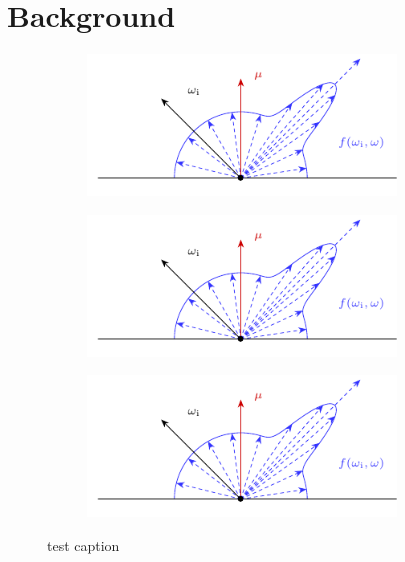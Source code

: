 \documentclass[crop=false]{standalone}
\begin{document}
  \section{Background}

  \begin{figure}[H]
    \center
    \begin{subfigure}[b]{0.32\textwidth}
      \center
      \includegraphics[width=0.9\textwidth]{brdf_1.pdf}
    \end{subfigure}
    \begin{subfigure}[b]{0.32\textwidth}
      \center
      \includegraphics[width=0.9\textwidth]{brdf_1.pdf}
    \end{subfigure}
    \begin{subfigure}[b]{0.32\textwidth}
      \center
      \includegraphics[width=0.9\textwidth]{brdf_1.pdf}
    \end{subfigure}
    \caption{test caption}
  \end{figure}
\end{document}
